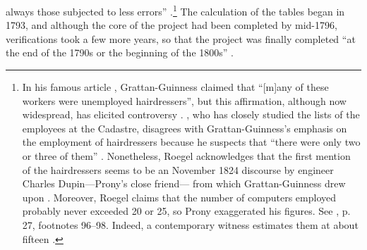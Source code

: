 \documentclass[version=last,draft=false,paper=A4,portrait,twoside=true,twocolumn=false,headinclude=false,footinclude=false,fontsize=12,BCOR=20mm,DIV=calc,pagesize=auto,titlepage=firstiscover,mpinclude=false,open=right,chapterprefix=true,numbers=autoendperiod,headsepline=false,headings=twolinechapter,parskip=false]{scrbook}
\begin{document}
always those subjected to less errors'' \autocite[53]{prony1804}.\footnote{In his famous article ,
Grattan-Guinness claimed that ``[m]any of these workers were unemployed
hairdressers'', but this affirmation, although now widespread, has elicited
controversy \autocite[179]{grattan-guinness1990}. \textcite{roegel2011},
who has closely studied the lists of the employees at the Cadastre,
disagrees with Grattan-Guinness's emphasis on the employment of
hairdressers because he suspects that ``there were only two or three of
them'' \parencite[26]{roegel2011}. Nonetheless, Roegel acknowledges that
the first mention of the hairdressers seems to be an 
November 1824 discourse by engineer Charles Dupin---Prony's close friend---
from which Grattan-Guinness drew upon \parencite{dupin1824}. Moreover, Roegel
claims that the number of computers employed probably never exceeded 20 or
25, so Prony exaggerated his figures. See \textcite{roegel2011}, p. 27,
footnotes 96--98. Indeed, a contemporary witness estimates them at about
fifteen \autocite[744]{laLande1803}.}
The calculation of the tables began in 1793, and although the core of the
project had been completed by mid-1796, verifications took a few more
years, so that the project was finally completed ``at the end of the 1790s
or the beginning of the 1800s'' \autocite[37]{roegel2011}.
\end{document}
